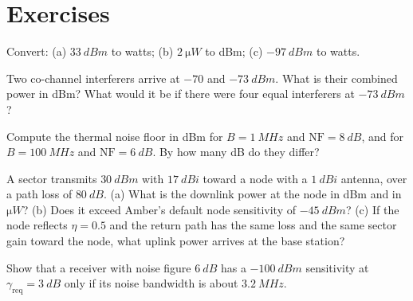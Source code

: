 \section*{Exercises}
\begin{exercise}
Convert: (a) $\SI{33}{dBm}$ to watts; (b) $\SI{2}{\micro W}$ to dBm; (c) $\SI{-97}{dBm}$ to watts.
\end{exercise}
\begin{exercise}
Two co-channel interferers arrive at $-70$ and $\SI{-73}{dBm}$. What is their combined power in dBm? What would it be if there were four equal interferers at $\SI{-73}{dBm}$?
\end{exercise}
\begin{exercise}
Compute the thermal noise floor in dBm for $B=\SI{1}{MHz}$ and $\mathrm{NF}=\SI{8}{dB}$, and for $B=\SI{100}{MHz}$ and $\mathrm{NF}=\SI{6}{dB}$. By how many dB do they differ?
\end{exercise}
\begin{exercise}\label{ex:linkbudget1}
A sector transmits $\SI{30}{dBm}$ with $\SI{17}{dBi}$ toward a node with a $\SI{1}{dBi}$ antenna, over a path loss of $\SI{80}{dB}$. (a) What is the downlink power at the node in dBm and in $\si{\micro W}$? (b) Does it exceed Amber's default node sensitivity of $\SI{-45}{dBm}$? (c) If the node reflects $\eta=0.5$ and the return path has the same loss and the same sector gain toward the node, what uplink power arrives at the base station?
\end{exercise}
\begin{exercise}\label{ex:bwsens}
Show that a receiver with noise figure $\SI{6}{dB}$ has a $\SI{-100}{dBm}$ sensitivity at $\gamma_{\mathrm{req}}=\SI{3}{dB}$ only if its noise bandwidth is about $\SI{3.2}{MHz}$.
\end{exercise}
